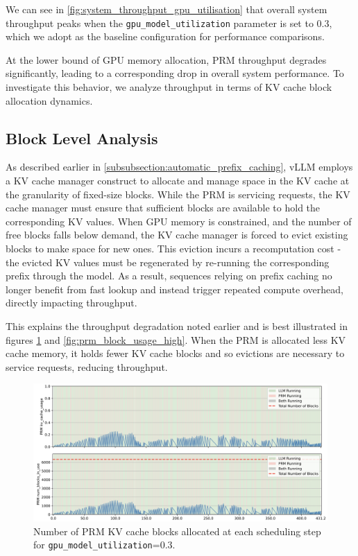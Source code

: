 \documentclass[12pt,twoside]{report}
\begin{document}
We can see in \ref{fig:system_throughput_gpu_utilisation} that overall system throughput peaks when the \texttt{gpu\_model\_utilization} parameter is set to 0.3, which we adopt as the baseline configuration for performance comparisons.

At the lower bound of GPU memory allocation, PRM throughput degrades significantly, leading to a corresponding drop in overall system performance. 
To investigate this behavior, we analyze throughput in terms of KV cache block allocation dynamics.

\subsection{Block Level Analysis}

As described earlier in \ref{subsubsection:automatic_prefix_caching}, vLLM employs a KV cache manager construct to allocate and manage space in the KV cache at the granularity of fixed-size blocks. 
While the PRM is servicing requests, the KV cache manager must ensure that sufficient blocks are available to hold the corresponding KV values. 
When GPU memory is constrained, and the number of free blocks falls below demand, the KV cache manager is forced to evict existing blocks to make space for new ones. 
This eviction incurs a recomputation cost - the evicted KV values must be regenerated by re-running the corresponding prefix through the model. 
As a result, sequences relying on prefix caching no longer benefit from fast lookup and instead trigger repeated compute overhead, directly impacting throughput.

This explains the throughput degradation noted earlier and is best illustrated in figures \ref{fig:prm_block_usage_low} and \ref{fig:prm_block_usage_high}.
When the PRM is allocated less KV cache memory, it holds fewer KV cache blocks and so evictions are necessary to service requests, reducing throughput.

\begin{figure}[htbp]
  \centering
  \includegraphics[width=\textwidth]{figures/prm_block_usage_low.png}
  \caption{Number of PRM KV cache blocks allocated at each scheduling step for \texttt{gpu\_model\_utilization}=0.3.}
  \label{fig:prm_block_usage_low}
\end{figure}
\end{document}
